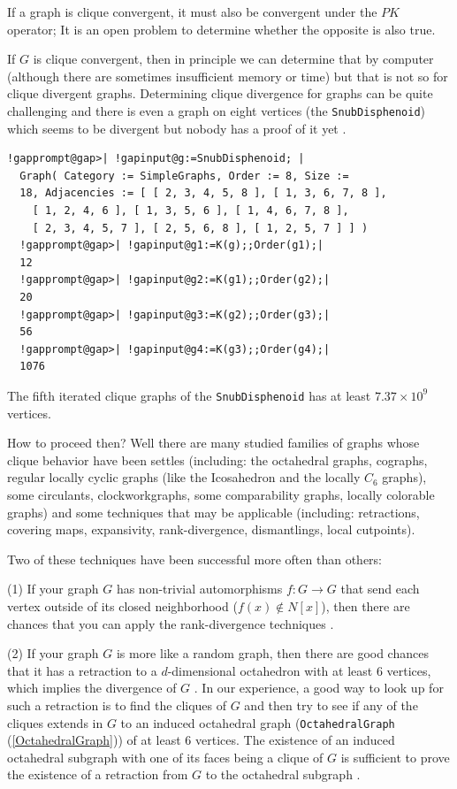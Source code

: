 \documentclass[a4paper,11pt]{report}
\begin{document}
{{If a graph is clique convergent, it must also be convergent under the $PK$ operator; It is an open problem to determine whether the opposite is also
true. 

If $G$ is clique convergent, then in principle we can determine that by computer
(although there are sometimes insufficient memory or time) but that is not so
for clique divergent graphs. Determining clique divergence for graphs can be
quite challenging and there is even a graph on eight vertices (the \texttt{SnubDisphenoid}) which seems to be divergent but nobody has a proof of it yet \cite{LNP06}. 

 
\begin{Verbatim}[commandchars=!@|,fontsize=\small,frame=single,label=Example]
  !gapprompt@gap>| !gapinput@g:=SnubDisphenoid; |
  Graph( Category := SimpleGraphs, Order := 8, Size := 
  18, Adjacencies := [ [ 2, 3, 4, 5, 8 ], [ 1, 3, 6, 7, 8 ], 
    [ 1, 2, 4, 6 ], [ 1, 3, 5, 6 ], [ 1, 4, 6, 7, 8 ], 
    [ 2, 3, 4, 5, 7 ], [ 2, 5, 6, 8 ], [ 1, 2, 5, 7 ] ] )
  !gapprompt@gap>| !gapinput@g1:=K(g);;Order(g1);|
  12
  !gapprompt@gap>| !gapinput@g2:=K(g1);;Order(g2);|
  20
  !gapprompt@gap>| !gapinput@g3:=K(g2);;Order(g3);|
  56
  !gapprompt@gap>| !gapinput@g4:=K(g3);;Order(g4);|
  1076
\end{Verbatim}
 

The fifth iterated clique graphs of the \texttt{SnubDisphenoid} has at least $7.37\times 10^9$ vertices. 

How to proceed then? Well there are many studied families of graphs whose
clique behavior have been settles (including: the octahedral graphs, cographs,
regular locally cyclic graphs (like the Icosahedron and the locally $C_6$ graphs), some circulants, clockworkgraphs, some comparability graphs, locally
colorable graphs) and some techniques that may be applicable (including:
retractions, covering maps, expansivity, rank-divergence, dismantlings, local
cutpoints). 

Two of these techniques have been successful more often than others: 

(1) If your graph $G$ has non-trivial automorphisms $f:G\rightarrow G$ that send each vertex outside of its closed neighborhood ($f(x)\not\in N[x]$), then there are chances that you can apply the rank-divergence techniques \cite{LNP06}\cite{LNP09}. 

(2) If your graph $G$ is more like a random graph, then there are good chances that it has a
retraction to a $d$-dimensional octahedron with at least 6 vertices, which implies the divergence
of $G$ \cite{Neu78}. In our experience, a good way to look up for such a retraction is to find
the cliques of $G$ and then try to see if any of the cliques extends in $G$ to an induced octahedral graph (\texttt{OctahedralGraph} (\ref{OctahedralGraph})) of at least 6 vertices. The existence of an induced octahedral subgraph with
one of its faces being a clique of $G$ is sufficient to prove the existence of a retraction from $G$ to the octahedral subgraph \cite{Kah09}\cite{LPV08b}. }

 }
\end{document}
